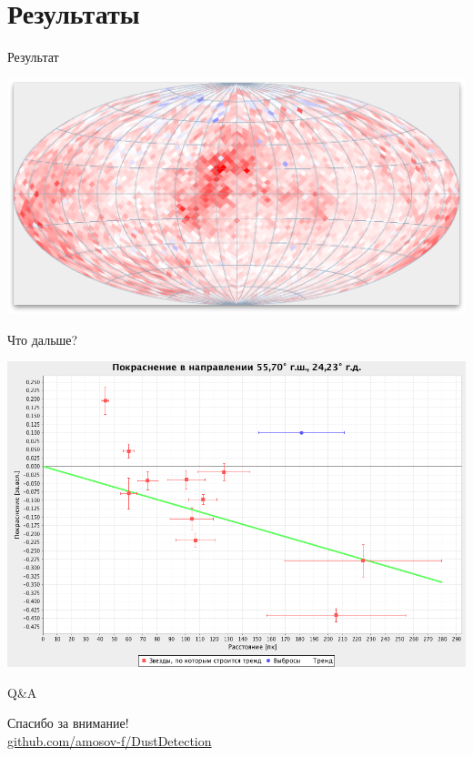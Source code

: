 \documentclass[14pt, fleqn, xcolor={dvipsnames, table}]{beamer}
\begin{document}
    \section{Результаты}                
        
        \begin{frame}{Результат}
            \begin{center}
                \includegraphics[scale=0.32]{map-k.png}
            \end{center}             
        \end{frame}
        
        \begin{frame}{Что дальше?}
            \begin{center}
                \includegraphics[scale=0.35]{next-k.png}
            \end{center}             
        \end{frame}    
        
        \begin{frame}{Q\&A}
            \begin{center}
                Спасибо за внимание!\\
                \href{https://github.com/amosov-f/DustDetection}{github.com/amosov-f/DustDetection}
            \end{center}
        \end{frame}
\end{document}
